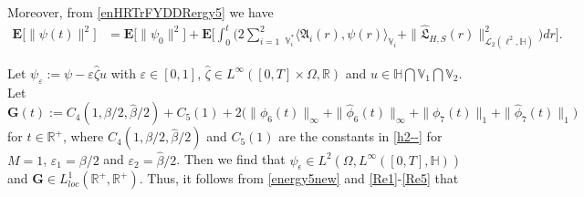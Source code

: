 \documentclass[11pt]{article}
\numberwithin{equation}{section}
\begin{document}
Moreover, from
  \eqref{enHRTrFYDDRergy5} we have
\begin{align}\label{enerudufoogy}
\mathbf{E}\big[\|\psi(t)\|^{2}\big]
		& =\mathbf{E}\big[
\|\psi_0\|^{2}\big]	
+ \mathbf{E}\bigg[\int_{0}^t\bigg( 2\sum_{i=1}^2\ _{\mathbb{V}^*_i}\langle \mathfrak{A}_i(r) ,\psi(r)\rangle_{\mathbb{V}_i}
		+\|\widehat{\mathfrak{L}}_{H,S}(r)
\|^2_{\mathcal{L}_2(\ell^2,
			\mathbb{H})}\bigg)dr\bigg].
	\end{align}
	


Let $\psi_\varepsilon:=\psi-\varepsilon
	\widehat{\zeta} u$
	with
	$\varepsilon \in [0,1]$,
	$\widehat{\zeta}\in L^\infty([0,T]
	\times\Omega,\mathbb{R})$
	and $u\in\mathbb{H}\bigcap\mathbb{V}_1
\bigcap\mathbb{V}_2$. Let
$\mathbf{G}(t):=
C_4(1,\beta/2,\widehat{\beta}/2)+C_5(1)
+2\big(
\|\phi_6(t)
\|_{\infty}
+\|\widehat{\phi}_6(t)
\|_{\infty}+\|\phi_7(t)
\|_{1}+\|\widehat{\phi}_7(t)
\|_{1}\big) $ for
$t\in \mathbb{R}^+$, where
  $C_4(1,\beta/2,\widehat{\beta}/2)$ and $C_5(1)$
are the
constants
in   \eqref{h2--} for $M=1$, $\varepsilon_1=\beta/2$ and
$\varepsilon_2=\widehat{\beta}/2$.
Then we find that $\psi_\epsilon\in L^2(\Omega, L^\infty([0,T],\mathbb{H}) )$ and
$\mathbf{G}\in
L_{loc}^{1}(\mathbb{R}^+,\mathbb{R}^+)$.
Thus, it follows from \eqref{energy5new} and \eqref{Re1}-\eqref{Re5}
that
\end{document}

